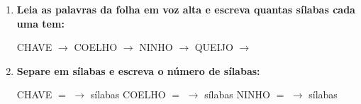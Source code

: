 \begin{exercicio}
\begin{enumerate}[resume]
  \item \textbf{Leia as palavras da folha em voz alta e escreva quantas sílabas cada uma tem:}

  \begin{center}
  CHAVE $\rightarrow$ \underline{\hspace{1cm}} \quad COELHO $\rightarrow$ \underline{\hspace{1cm}} \quad NINHO $\rightarrow$ \underline{\hspace{1cm}} \quad QUEIJO $\rightarrow$ \underline{\hspace{1cm}}
  \end{center}

  \item \textbf{Separe em sílabas e escreva o número de sílabas:}
  \begin{center}
  CHAVE $=$ \underline{\hspace{1.2cm}} $\rightarrow$ \underline{\hspace{0.8cm}} sílabas \quad COELHO $=$ \underline{\hspace{1.2cm}} $\rightarrow$ \underline{\hspace{0.8cm}} sílabas \quad NINHO $=$ \underline{\hspace{1.2cm}} $\rightarrow$ \underline{\hspace{0.8cm}} sílabas
  \end{center}

\end{enumerate}

\end{exercicio}



